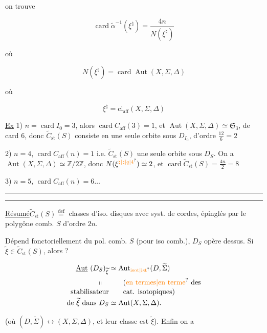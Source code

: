 on trouve

\[
\operatorname{card}\widetilde\alpha^{-1}(\xi^\natural)=\frac{4n}{N(\xi^\natural)}
\]

où

\[
N(\xi^\natural)=\operatorname{card}\operatorname{Aut}(X,\Sigma,\Delta)
\]

où

\[
\xi^\natural=\mathrm{cl}_{\mathrm{aff}}(X,\Sigma,\Delta)
\]

\uline{Ex} 1) $n=\operatorname{card}I_0=3$, alors $\operatorname{card}C_{\mathrm{aff}}(3)=1$, et $\operatorname{Aut}(X,\Sigma,\Delta)\simeq\mathfrak S_3$, de card $6$, donc $\widetilde C_{\mathrm{st}}(S)$ consiste en une seule orbite sous $D_{I_0}$, d'ordre $\frac{12}{6}=2$

2) $n=4$, $\operatorname{card} C_{\mathrm{aff}}(n)=1$ i.e. $\widetilde C_{\mathrm{st}}(S)$ une seule orbite sous $D_S$.  On a $\operatorname{Aut}(X,\Sigma,\Delta)\simeq\mathbb Z/2\mathbb Z$, donc $N(\xi^{\unsure{\natural|\sharp|q|4}})\simeq 2$, et $\operatorname{card}\widetilde C_{\mathrm{st}}(S)=\frac{4n}{2}=8$

3) $n=5$, $\operatorname{card} C_{\mathrm{aff}}(n)=6\ldots$

\noindent\rule{\linewidth}{0.35pt}\par\noindent\rule{\linewidth}{0.35pt}

\uline{Résumé}\qquad $\widetilde C_{\mathrm{st}}(S)\overset{\mathrm{def}}{=}$ classes d'iso.  disques avec syst.  de cordes, épinglés par le polygône comb. $S$ d'ordre $2n$.

Dépend fonctoriellement du pol. comb. $S$ (pour iso comb.),   $D_S$ opère dessus. Si $\widetilde\xi\in\widetilde C_{\mathrm{st}}(S)$, alors ?

\[
\begin{aligned}
\deleted{\operatorname{Aut}}\ (D_S)_{\widetilde\xi}&\simeq\operatorname{Aut}_{\unsure{\mathrm{isot}|\mathrm{ist}}}(D,\widetilde\Sigma)\\
\shortparallel\quad&\qquad\text{(\unsure{en termes|en terme} des}\\[-2pt]
\text{stabilisateur}&\qquad\text{cat. isotopiques)}\\[-2pt]
\text{de }\widetilde\xi\text{ dans }D_S&\simeq\operatorname{Aut}(X,\Sigma,\Delta).
\end{aligned}
\]

(où $(D,\widetilde\Sigma)\longleftrightarrow(X,\Sigma,\Delta)$, et leur classe est $\widetilde\xi$). Enfin on a

